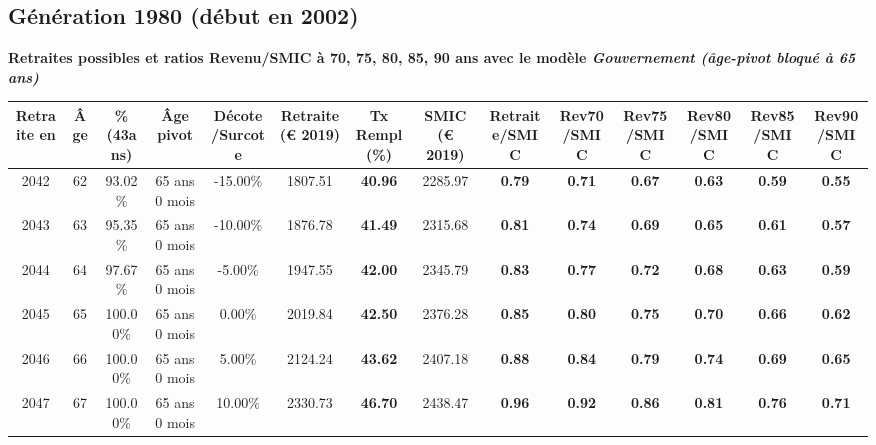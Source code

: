 \newpage 
 
\subsection{Génération 1980 (début en 2002)} 

{\bf \noindent Retraites possibles et ratios Revenu/SMIC à 70, 75, 80, 85, 90 ans avec le modèle \emph{Gouvernement (âge-pivot bloqué à 65 ans)}}  
 
\begin{adjustbox}{max width=\textwidth} 
\begin{tabular}[htb]{|c|c||c|c|c||c|c||c||c|c|c|c|c|c|} 
\hline 
 Retraite en &  Âge &  \%(43ans) &  Âge pivot &  Décote/Surcote &  Retraite (\euro{} 2019) &  Tx Rempl(\%) &  SMIC (\euro{} 2019) &  Retraite/SMIC &  Rev70/SMIC &  Rev75/SMIC &  Rev80/SMIC &  Rev85/SMIC &  Rev90/SMIC \\ 
\hline \hline 
 2042 &  62 &  93.02\% &  65 ans 0 mois &  -15.00\% &  1807.51 &  {\bf 40.96} &  2285.97 &  {\bf {\color{red} 0.79}} &  {\bf {\color{red} 0.71}} &  {\bf {\color{red} 0.67}} &  {\bf {\color{red} 0.63}} &  {\bf {\color{red} 0.59}} &  {\bf {\color{red} 0.55}} \\ 
\hline 
 2043 &  63 &  95.35\% &  65 ans 0 mois &  -10.00\% &  1876.78 &  {\bf 41.49} &  2315.68 &  {\bf {\color{red} 0.81}} &  {\bf {\color{red} 0.74}} &  {\bf {\color{red} 0.69}} &  {\bf {\color{red} 0.65}} &  {\bf {\color{red} 0.61}} &  {\bf {\color{red} 0.57}} \\ 
\hline 
 2044 &  64 &  97.67\% &  65 ans 0 mois &  -5.00\% &  1947.55 &  {\bf 42.00} &  2345.79 &  {\bf {\color{red} 0.83}} &  {\bf {\color{red} 0.77}} &  {\bf {\color{red} 0.72}} &  {\bf {\color{red} 0.68}} &  {\bf {\color{red} 0.63}} &  {\bf {\color{red} 0.59}} \\ 
\hline 
 2045 &  65 &  100.00\% &  65 ans 0 mois &  0.00\% &  2019.84 &  {\bf 42.50} &  2376.28 &  {\bf {\color{red} 0.85}} &  {\bf {\color{red} 0.80}} &  {\bf {\color{red} 0.75}} &  {\bf {\color{red} 0.70}} &  {\bf {\color{red} 0.66}} &  {\bf {\color{red} 0.62}} \\ 
\hline 
 2046 &  66 &  100.00\% &  65 ans 0 mois &  5.00\% &  2124.24 &  {\bf 43.62} &  2407.18 &  {\bf {\color{red} 0.88}} &  {\bf {\color{red} 0.84}} &  {\bf {\color{red} 0.79}} &  {\bf {\color{red} 0.74}} &  {\bf {\color{red} 0.69}} &  {\bf {\color{red} 0.65}} \\ 
\hline 
 2047 &  67 &  100.00\% &  65 ans 0 mois &  10.00\% &  2330.73 &  {\bf 46.70} &  2438.47 &  {\bf {\color{red} 0.96}} &  {\bf {\color{red} 0.92}} &  {\bf {\color{red} 0.86}} &  {\bf {\color{red} 0.81}} &  {\bf {\color{red} 0.76}} &  {\bf {\color{red} 0.71}} \\ 
\hline 
\hline 
\end{tabular} 
\end{adjustbox} 
 
